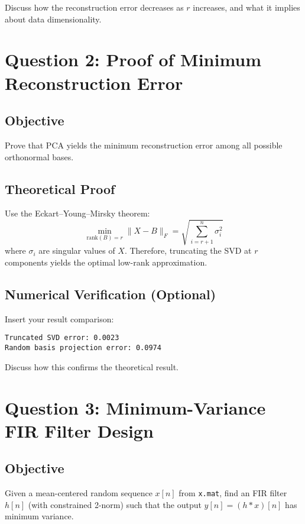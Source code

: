 \documentclass[12pt,a4paper]{article}
\begin{document}
Discuss how the reconstruction error decreases as $r$ increases, and what it implies about data dimensionality.

\newpage
\section{Question 2: Proof of Minimum Reconstruction Error}

\subsection{Objective}
Prove that PCA yields the minimum reconstruction error among all possible orthonormal bases.

\subsection{Theoretical Proof}
Use the Eckart–Young–Mirsky theorem:
\[
\min_{\text{rank}(B)=r} \|X - B\|_F = \sqrt{\sum_{i=r+1}^{n} \sigma_i^2}
\]
where $\sigma_i$ are singular values of $X$.  
Therefore, truncating the SVD at $r$ components yields the optimal low-rank approximation.

\subsection{Numerical Verification (Optional)}
Insert your result comparison:
\begin{verbatim}
Truncated SVD error: 0.0023
Random basis projection error: 0.0974
\end{verbatim}

Discuss how this confirms the theoretical result.

\newpage
\section{Question 3: Minimum-Variance FIR Filter Design}

\subsection{Objective}
Given a mean-centered random sequence $x[n]$ from \texttt{x.mat},  
find an FIR filter $h[n]$ (with constrained 2-norm) such that the output $y[n] = (h*x)[n]$ has minimum variance.
\end{document}
